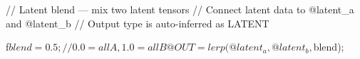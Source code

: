 // Latent blend — mix two latent tensors
// Connect latent data to @latent_a and @latent_b
// Output type is auto-inferred as LATENT

f$blend = 0.5;   // 0.0 = all A, 1.0 = all B

@OUT = lerp(@latent_a, @latent_b, $blend);
